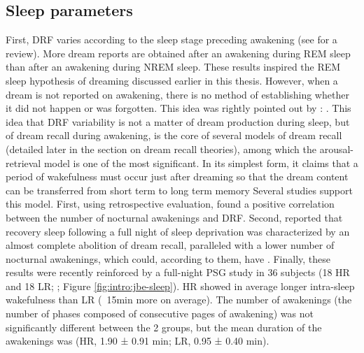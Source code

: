 \subsection{Sleep parameters}
\label{sec:dream-recall:param:sleep}

First, DRF varies according to the sleep stage preceding awakening (see \citealp{nielsen_review_2000} for a review). More dream reports are obtained after an awakening during REM sleep than after an awakening during NREM sleep. These results inspired the REM sleep hypothesis of dreaming discussed earlier in this thesis. However, when a dream is not reported on awakening, there is no method of establishing whether it did not happen or was forgotten. This idea was rightly pointed out by \citet{conduit_poor_2004}: .
This idea that DRF variability is not a matter of dream production during sleep, but of dream recall during awakening, is the core of several models of dream recall (detailed later in the section on dream recall theories), among which the arousal-retrieval model is one of the most significant. In its simplest form, it claims that a period of wakefulness must occur just after dreaming so that the dream content can be transferred from short term to long term memory \citep{koulack_dream_1976}
Several studies support this model. First, using retrospective evaluation, \citet{schredl_factors_2003} found a positive correlation between the number of nocturnal awakenings and DRF. Second, \citet{de_gennaro_recovery_2010} reported that recovery sleep following a full night of sleep deprivation was characterized by an almost complete abolition of dream recall, paralleled with a lower number of nocturnal awakenings, which could, according to them, have . Finally, these results were recently reinforced by a full-night PSG study in 36 subjects (18 HR and 18 LR; \citealp{eichenlaub_brain_2014}; Figure \ref{fig:intro:jbe-sleep}). HR showed in average longer intra-sleep wakefulness than LR (~15min more on average). The number of awakenings (the number of phases composed of consecutive pages of awakening) was not significantly different between the 2 groups, but the mean duration of the awakenings was (HR, 1.90 ± 0.91 min; LR, 0.95 ± 0.40 min).


